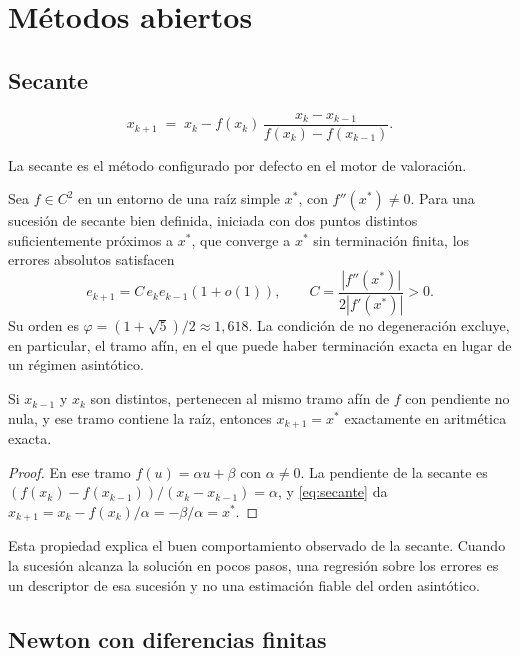 \section{Métodos abiertos}

\subsection{Secante}

\begin{equation}
\label{eq:secante}
  x_{k+1} \;=\; x_k - f(x_k)\,\frac{x_k-x_{k-1}}{f(x_k)-f(x_{k-1})} .
\end{equation}

La secante es el método configurado por defecto en el motor de valoración.

\begin{theorem}
\label{thm:orden-secante}
Sea $f\in C^2$ en un entorno de una raíz simple $x^*$, con
$f''(x^*)\ne0$. Para una sucesión de secante bien definida, iniciada con
dos puntos distintos suficientemente próximos a $x^*$, que converge a
$x^*$ sin terminación finita, los errores absolutos satisfacen
\[
 e_{k+1}=C\,e_ke_{k-1}(1+o(1)),\qquad
 C=\frac{|f''(x^*)|}{2|f'(x^*)|}>0.
\]
Su orden es $\varphi=(1+\sqrt5)/2\approx1{,}618$. La condición de no
degeneración excluye, en particular, el tramo afín, en el que puede haber
terminación exacta en lugar de un régimen asintótico.
\end{theorem}

\begin{proposition}
\label{prop:secante-afin}
Si $x_{k-1}$ y $x_k$ son distintos, pertenecen al mismo tramo afín de $f$
con pendiente no nula, y ese tramo contiene la raíz, entonces
$x_{k+1}=x^*$ exactamente en aritmética exacta.
\end{proposition}
\begin{proof}
En ese tramo $f(u)=\alpha u+\beta$ con $\alpha\neq0$. La pendiente de la secante es
$(f(x_k)-f(x_{k-1}))/(x_k-x_{k-1})=\alpha$, y \cref{eq:secante} da
$x_{k+1}=x_k-f(x_k)/\alpha=-\beta/\alpha=x^*$.
\end{proof}

Esta propiedad explica el buen comportamiento observado de la secante. Cuando
la sucesión alcanza la solución en pocos pasos, una regresión sobre los errores
es un descriptor de esa sucesión y no una estimación fiable del orden
asintótico.

\subsection{Newton con diferencias finitas}

